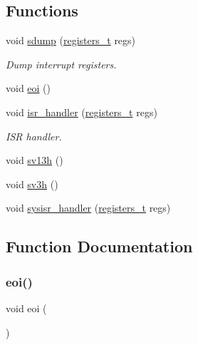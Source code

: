 \subsection*{Functions}
\begin{DoxyCompactItemize}
\item 
void \hyperlink{a00113_a4b4233daef6e041e7278cae2b21b5ed4_a4b4233daef6e041e7278cae2b21b5ed4}{sdump} (\hyperlink{a00140_adf58dbaf6139b4957c348711f2026957_adf58dbaf6139b4957c348711f2026957}{registers\+\_\+t} regs)
\begin{DoxyCompactList}\small\item\em Dump interrupt registers. \end{DoxyCompactList}\item 
void \hyperlink{a00113_a4af3b3eec03921259f5db474506c0c8d_a4af3b3eec03921259f5db474506c0c8d}{eoi} ()
\item 
void \hyperlink{a00113_a700e3ca056bf69296370f504f2cb6cc8_a700e3ca056bf69296370f504f2cb6cc8}{isr\+\_\+handler} (\hyperlink{a00140_adf58dbaf6139b4957c348711f2026957_adf58dbaf6139b4957c348711f2026957}{registers\+\_\+t} regs)
\begin{DoxyCompactList}\small\item\em I\+SR handler. \end{DoxyCompactList}\item 
void \hyperlink{a00113_aeeac7331d1a449871656eeb6ac73fd25_aeeac7331d1a449871656eeb6ac73fd25}{sv13h} ()
\item 
void \hyperlink{a00113_ad118f86f4af40a3b4b94bc7c4977e762_ad118f86f4af40a3b4b94bc7c4977e762}{sv3h} ()
\item 
void \hyperlink{a00113_abd1fa375737cd5ecd84c082738e3b195_abd1fa375737cd5ecd84c082738e3b195}{sysisr\+\_\+handler} (\hyperlink{a00140_adf58dbaf6139b4957c348711f2026957_adf58dbaf6139b4957c348711f2026957}{registers\+\_\+t} regs)
\end{DoxyCompactItemize}


\subsection{Function Documentation}
\mbox{\label{a00113_a4af3b3eec03921259f5db474506c0c8d_a4af3b3eec03921259f5db474506c0c8d}} 
\subsubsection{\texorpdfstring{eoi()}{eoi()}}
{\footnotesize\ttfamily void eoi (\begin{DoxyParamCaption}{ }\end{DoxyParamCaption})}



